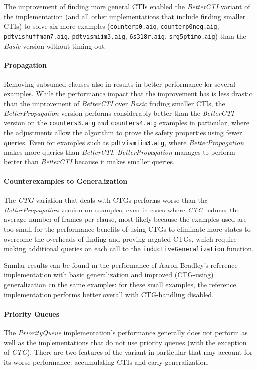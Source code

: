 \documentclass[12pt,a4paper,twoside,openright]{report}
\begin{document}
{{The improvement of finding more general CTIs enabled the \emph{BetterCTI} variant of the implementation
(and all other implementations that include finding smaller CTIs) to
solve six more examples (\verb,counterp0.aig,, \verb,counterp0neg.aig,, \verb,pdtvishuffman7.aig,, 
\verb,pdtvismiim3.aig,, \verb,6s318r.aig,, \verb,srg5ptimo.aig,) than the \emph{Basic} version without
timing out.}

\paragraph{Propagation}{
Removing subsumed clauses also in results in better performance for several examples.
While the performance impact that the improvement has is less drastic than the improvement of
\emph{BetterCTI} over \emph{Basic} finding smaller CTIs, the \emph{BetterPropagation} version performs
considerably better
than the \emph{BetterCTI} version on the \verb,counters3.aig, and \verb,counters4.aig, examples in
particular, where the adjustments allow the algorithm to prove the safety properties using fewer
queries. Even for examples such as \verb,pdtvismiim3.aig,, where \emph{BetterPropagation} makes more
queries than \emph{BetterCTI}, \emph{BetterPropagation} manages to perform better than \emph{BetterCTI}
because it makes smaller queries.}

\paragraph{Counterexamples to Generalization}{
The \emph{CTG} variation that deals with CTGs performs worse than the \emph{BetterPropagation} version
on examples, even in cases where \emph{CTG} reduces the average number of frames per clause,
most likely because the examples used are too small for the performance benefits of using CTGs to
eliminate more states to overcome the overheads of finding and proving negated CTGs, which require
making additional queries on each call to the \verb,inductiveGeneralization, function.

Similar results can be found
in the performance of Aaron Bradley's reference implementation with basic generalization and
improved (CTG-using) generalization on the same examples: for these small examples,
the reference implementation performs better overall with CTG-handling disabled.}

\paragraph{Priority Queues}{
The \emph{PriorityQueue} implementation's performance generally does not perform as well as the
implementations that do not use priority queues (with the exception of \emph{CTG}). There are
two features of the variant in particular that may account for its worse performance: accumulating
CTIs and early generalization.

}}
\end{document}
